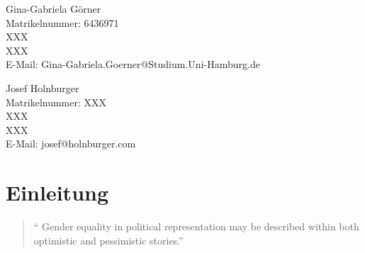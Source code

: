\documentclass[12pt, 
    twoside=false, 
    bibliography=totoc, 
    numbers=endperiod, 
    headings=normal, 
    toc=chapterentrydotfill
    ]{scrbook}
\begin{document}
\begin{titlepage}
	\begin{minipage}[t]{0.48\textwidth}
    \flushleft 
    Gina-Gabriela Görner \\
    Matrikelnummer: 6436971 \\
    XXX \vspace{0.1cm} \\ 
	XXX \vspace{0.1cm}  \\
	E-Mail: Gina-Gabriela.Goerner@Studium.Uni-Hamburg.de \\ 
    \end{minipage}
    \begin{minipage}[t]{0.48\textwidth}
	\flushleft
	Josef Holnburger \\
	Matrikelnummer: XXX \\
	XXX \vspace{0.1cm} \\
	XXX \vspace{0.1cm} \\
	E-Mail: josef@holnburger.com \\
    \end{minipage}

\end{titlepage}

\frontmatter

\tableofcontents

\listoffigures
{}
\vspace*{24pt}
{\let\clearpage\relax \listoftables}	

\mainmatter



\chapter{Einleitung}\label{Einleitung} 

\begin{quote}
\enquote{
Gender equality in political representation may be described within both optimistic
and pessimistic stories.} \parencite[149]{celis_2018}
\end{quote}
\end{document}
